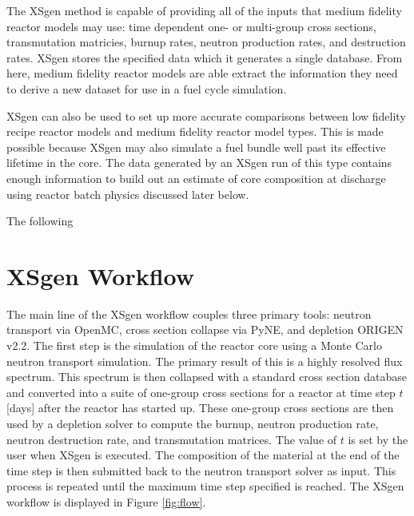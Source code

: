 \documentclass{article}
\begin{document}
The XSgen method is capable of providing all of the inputs that medium fidelity reactor models
may use: time dependent one- or multi-group cross sections, transmutation matricies,
burnup rates, neutron production rates, and destruction rates.
XSgen stores the specified data which it generates a single database.
From here, medium fidelity reactor models are able extract the information they need to
derive a new dataset for use in a fuel cycle simulation.

XSgen can also be used to set up more accurate comparisons between low fidelity recipe reactor
models and medium fidelity reactor model types. This is made possible because XSgen may also
simulate a fuel bundle well past its effective lifetime in the core. The data generated by an
XSgen run of this type contains enough information to build out an estimate of core composition
at discharge using reactor batch physics discussed later below.

The following 

\section{XSgen Workflow}
\label{sec-workflow}
The main line of the XSgen workflow couples three primary tools: neutron transport via OpenMC,
cross section collapse via PyNE, and depletion ORIGEN v2.2. The first step is the simulation
of the reactor core using a Monte Carlo neutron transport simulation. The primary result of
this is a highly resolved flux spectrum. This spectrum is then collapsed with a standard
cross section database and converted into a suite of one-group cross sections for a reactor
at time step $t$ [days] after the reactor has started up. These one-group cross sections are
then used by a depletion solver to compute the burnup, neutron production rate, neutron
destruction rate, and transmutation matrices. The value of $t$ is set by the user when XSgen
is executed. The composition of the material at the end of the time step is then submitted
back to the neutron transport solver as input. This process is repeated until the maximum time
step specified is reached. The XSgen workflow is displayed in Figure \ref{fig:flow}.
\end{document}
